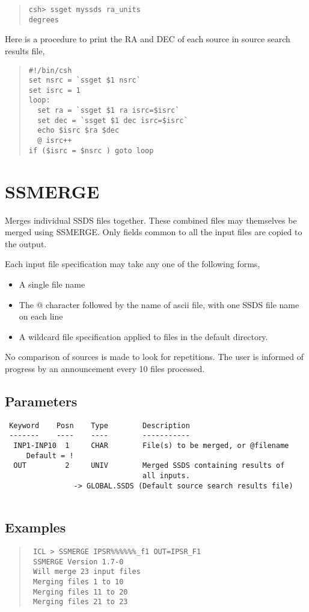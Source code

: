 \documentclass{book}
\renewcommand{\_}{{\tt\char'137}}     %
\begin{document}
\begin{quote}\begin{verbatim}
csh> ssget myssds ra_units
degrees
\end{verbatim}\end{quote}
Here is a procedure to print the RA and DEC of each source in source
search results file,
 
\begin{quote}\begin{verbatim}
#!/bin/csh
set nsrc = `ssget $1 nsrc`
set isrc = 1
loop:
  set ra = `ssget $1 ra isrc=$isrc`
  set dec = `ssget $1 dec isrc=$isrc`
  echo $isrc $ra $dec
  @ isrc++
if ($isrc = $nsrc ) goto loop
\end{verbatim}\end{quote}
\section{SSMERGE}
Merges individual SSDS files together. These combined files may
themselves be merged using SSMERGE. Only fields common to all
the input files are copied to the output.
 
Each input file specification may take any one of the following
forms,
\begin{itemize}
\item A single file name
\item The @ character followed by the name of ascii file, with
one SSDS file name on each line
\item A wildcard file specification applied to files in the
default directory.
\end{itemize}
No comparison of sources is made to look for repetitions. The
user is informed of progress by an announcement every 10 files
processed.
 
\subsection{Parameters}
\begin{verbatim}
 Keyword    Posn    Type        Description
 -------    ----    ----        -----------
  INP1-INP10  1     CHAR        File(s) to be merged, or @filename
     Default = !
  OUT         2     UNIV        Merged SSDS containing results of
                                all inputs.
                -> GLOBAL.SSDS (Default source search results file)
 
\end{verbatim}\subsection{Examples}
\begin{quote}\begin{verbatim}
 ICL > SSMERGE IPSR%%%%%%_f1 OUT=IPSR_F1
 SSMERGE Version 1.7-0
 Will merge 23 input files
 Merging files 1 to 10
 Merging files 11 to 20
 Merging files 21 to 23
 \end{verbatim}\end{quote}
\end{document}
